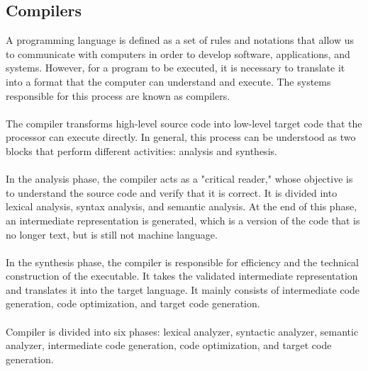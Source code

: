 \documentclass[letterpaper,12pt,oneside]{article}
\begin{document}
    \subsection{Compilers}
    A programming language is defined as a set of rules and notations that allow us to communicate with computers in order to develop software, applications, and systems. However, for a program to be executed, it is necessary to translate it into a format that the computer can understand and execute. The systems responsible for this process are known as compilers.
    \\ \\
    The compiler transforms high-level source code into low-level target code that the processor can execute directly. In general, this process can be understood as two blocks that perform different activities: analysis and synthesis.
    \\ \\
    In the analysis phase, the compiler acts as a "critical reader," whose objective is to understand the source code and verify that it is correct. It is divided into lexical analysis, syntax analysis, and semantic analysis. At the end of this phase, an intermediate representation is generated, which is a version of the code that is no longer text, but is still not machine language.
    \\ \\
    In the synthesis phase, the compiler is responsible for efficiency and the technical construction of the executable. It takes the validated intermediate representation and translates it into the target language. It mainly consists of intermediate code generation, code optimization, and target code generation.\cite{aho2008compiladores}
    \\ \\
    Compiler is divided into six phases: lexical analyzer, syntactic analyzer, semantic analyzer, intermediate code generation, code optimization, and target code generation.
\end{document}
